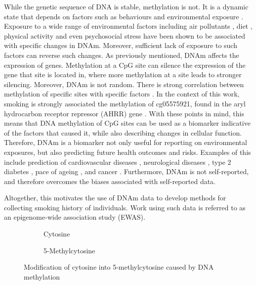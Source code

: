 \documentclass{article} %
\begin{document}
While the genetic sequence of DNA is stable, methylation is not. It is a dynamic state that depends on factors such as behaviours and environmental exposure \cite{greenberg2019diverse}. Exposure to a wide range of environmental factors including air pollutants \cite{martin2018environmental}, diet \cite{ma2020whole}, physical activity and even psychosocial stress \cite{opsasnick2024epigenome} have been shown to be associated with specific changes in DNAm. Moreover, sufficient lack of exposure to such factors can reverse such changes. As previously mentioned, DNAm affects the expression of genes. Methylation at a CpG site can silence the expression of the gene that site is located in, where more methylation at a site leads to stronger silencing. Moreover, DNAm is not random. There is strong correlation between methylation of specific sites with specific factors \cite{ewasatlas}. In the context of this work, smoking is strongly associated the methylation of cg05575921, found in the aryl hydrocarbon receptor
repressor (AHRR) gene \cite{reynolds2015dna}. With these points in mind, this means that DNA methylation of CpG sites can be used as a biomarker indicative of the factors that caused it, while also describing changes in cellular function. Therefore, DNAm is a biomarker not only useful for reporting on environmental exposures, but also predicting future health outcomes and risks. Examples of this include prediction of cardiovascular diseases \cite{cameron2023dna}, neurological diseases \cite{cells11213439}, type 2 diabetes \cite{cheng2023development}, pace of ageing \cite{10.7554/eLife.73420}, and cancer \cite{luo2020circulating}. Furthermore, DNAm is not self-reported, and therefore overcomes the biases associated with self-reported data.

Altogether, this motivates the use of DNAm data to develop methods for collecting smoking history of individuals. Work using such data is referred to as an epigenome-wide association study (EWAS).

\begin{figure}
    \begin{subfigure}{0.49\textwidth}
        \centering
        \hspace*{11mm}
        \vspace{3mm}
        \caption{Cytosine}
    \end{subfigure}
    \begin{subfigure}{0.49\textwidth}
        \centering
        \vspace{3mm}
        \caption{5-Methylcytosine}
    \end{subfigure}
    \caption[Methylation of cytosine]{Modification of cytosine into 5-methylcytosine caused by DNA methylation}
    \label{fig:cytosine-methylation}
\end{figure}
\end{document}
